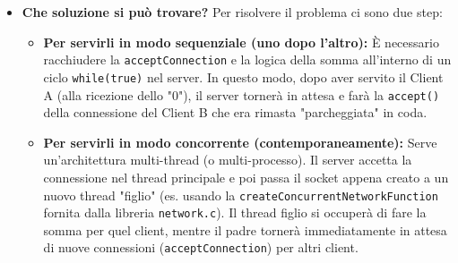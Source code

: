 \documentclass[11pt]{article}
\begin{document}
\begin{tcolorbox}[colback=green!5!white,colframe=green!75!black,title=\textbf{RISPOSTA}, breakable]
\begin{itemize}
    \item \textbf{Che soluzione si può trovare?} Per risolvere il problema ci sono due step:
    \begin{itemize}
        \item \textbf{Per servirli in modo sequenziale (uno dopo l'altro):} È necessario racchiudere la \texttt{acceptConnection} e la logica della somma all'interno di un ciclo \texttt{while(true)} nel server. In questo modo, dopo aver servito il Client A (alla ricezione dello "0"), il server tornerà in attesa e farà la \texttt{accept()} della connessione del Client B che era rimasta "parcheggiata" in coda.
        \item \textbf{Per servirli in modo concorrente (contemporaneamente):} Serve un'architettura multi-thread (o multi-processo). Il server accetta la connessione nel thread principale e poi passa il socket appena creato a un nuovo thread "figlio" (es. usando la \texttt{createConcurrentNetworkFunction} fornita dalla libreria \texttt{network.c}). Il thread figlio si occuperà di fare la somma per quel client, mentre il padre tornerà immediatamente in attesa di nuove connessioni (\texttt{acceptConnection}) per altri client.
    \end{itemize}
\end{itemize}
\end{tcolorbox}
\end{document}

